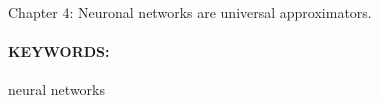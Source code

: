  Chapter 4: Neuronal networks are universal approximators.   
 
\paragraph{KEYWORDS:}
\begin{itemize*}[label=,itemsep=1em,itemjoin=\hspace{1em}]
  \item neural networks

\end{itemize*}

\endinput
